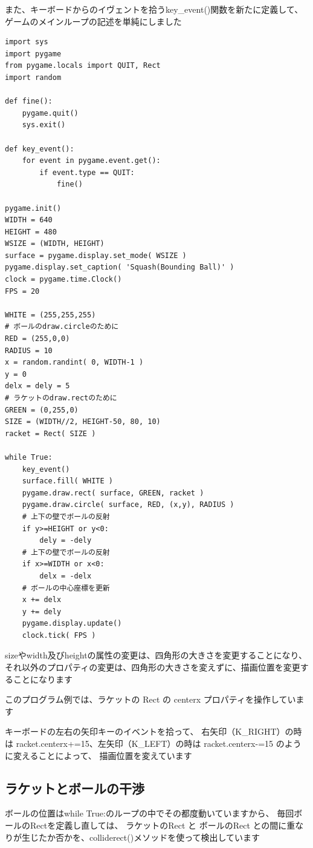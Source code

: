 \documentclass[uplatex,a4paper,11pt,oneside,openany]{jsbook}
\begin{document}
また、キーボードからのイヴェントを拾うkey\_event()関数を新たに定義して、
ゲームのメインループの記述を単純にしました

\begin{lstlisting}[caption=ラケットのRectを描画,label=pg08-0]
import sys
import pygame
from pygame.locals import QUIT, Rect
import random

def fine():
    pygame.quit()
    sys.exit()

def key_event():
    for event in pygame.event.get():
        if event.type == QUIT:
            fine()

pygame.init()
WIDTH = 640
HEIGHT = 480
WSIZE = (WIDTH, HEIGHT)
surface = pygame.display.set_mode( WSIZE )
pygame.display.set_caption( 'Squash(Bounding Ball)' )
clock = pygame.time.Clock()
FPS = 20

WHITE = (255,255,255)
# ボールのdraw.circleのために
RED = (255,0,0)
RADIUS = 10
x = random.randint( 0, WIDTH-1 )
y = 0
delx = dely = 5
# ラケットのdraw.rectのために
GREEN = (0,255,0)
SIZE = (WIDTH//2, HEIGHT-50, 80, 10)
racket = Rect( SIZE )

while True:
    key_event()
    surface.fill( WHITE )
    pygame.draw.rect( surface, GREEN, racket )
    pygame.draw.circle( surface, RED, (x,y), RADIUS )
    # 上下の壁でボールの反射
    if y>=HEIGHT or y<0:
        dely = -dely
    # 上下の壁でボールの反射
    if x>=WIDTH or x<0:
        delx = -delx
    # ボールの中心座標を更新
    x += delx
    y += dely
    pygame.display.update()
    clock.tick( FPS )
\end{lstlisting}%

sizeやwidth及びheightの属性の変更は、四角形の大きさを変更することになり、
それ以外のプロパティの変更は、四角形の大きさを変えずに、描画位置を変更することになります

このプログラム例では、ラケットの Rect の centerx プロパティを操作しています

キーボードの左右の矢印キーのイベントを拾って、
右矢印（K\_RIGHT）の時は racket.centerx+=15、左矢印（K\_LEFT）の時は racket.centerx-=15 のように変えることによって、
描画位置を変えています



\subsection{ラケットとボールの干渉}

ボールの位置はwhile True:のループの中でその都度動いていますから、
毎回ボールのRectを定義し直しては、
ラケットのRect と ボールのRect との間に重なりが生じたか否かを、colliderect()メソッドを使って検出しています
\end{document}

